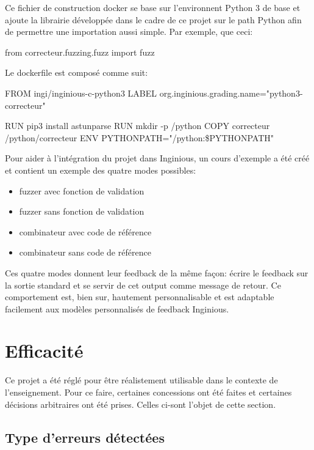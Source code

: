 \documentclass[a4paper]{report}
\begin{document}
Ce fichier de construction docker se base sur l'environnent Python 3 de base et ajoute la librairie développée dans le cadre de ce projet sur le path Python afin de permettre une importation aussi simple.
Par exemple, que ceci:

\begin{python}
from correcteur.fuzzing.fuzz import fuzz
\end{python}

Le dockerfile est composé comme suit:
\begin{python}
FROM ingi/inginious-c-python3
LABEL org.inginious.grading.name="python3-correcteur"


RUN pip3 install astunparse
RUN mkdir -p /python
COPY correcteur /python/correcteur
ENV PYTHONPATH="/python:\${PYTHONPATH}"
\end{python}


Pour aider à l'intégration du projet dans Inginious, un cours d'exemple a été créé et contient un exemple des quatre modes possibles:
\begin{itemize}
\item fuzzer avec fonction de validation
\item fuzzer sans fonction de validation
\item combinateur avec code de référence
\item combinateur sans code de référence
\end{itemize}
Ces quatre modes donnent leur feedback de la même façon: écrire le feedback sur la sortie standard et se servir de cet output comme message de retour.
Ce comportement est, bien sur, hautement personnalisable et est adaptable facilement aux modèles personnalisés de feedback Inginious.

\section{Efficacité}

Ce projet a été réglé pour être réalistement utilisable dans le contexte de l'enseignement.
Pour ce faire, certaines concessions  ont été faites et certaines décisions arbitraires ont été prises.
Celles ci-sont l'objet de cette section.

\subsection{Type d'erreurs détectées}

\end{document}
